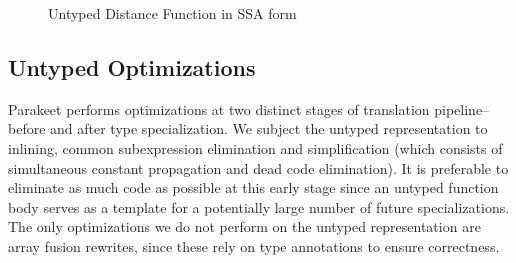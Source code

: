 \documentclass[preprint]{sigplanconf}
\begin{document}
\begin{figure}[h!]
\caption{Untyped Distance Function in SSA form}
\end{figure}



 
\subsection{Untyped Optimizations}
Parakeet performs optimizations at two distinct stages of translation pipeline-- before and after type specialization. We subject the untyped representation to inlining, common subexpression elimination and simplification (which consists of simultaneous constant propagation and dead code elimination). It is preferable to eliminate as much code as possible at this early stage since an untyped function body serves as a template for a potentially large number of future specializations. The only optimizations we do not perform on the untyped representation are array fusion rewrites, since these rely on type annotations to ensure correctness. 
\end{document}
